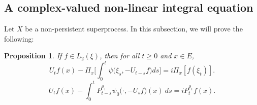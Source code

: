 \documentclass[12pt,a4paper]{amsart}
\theoremstyle{plain}
\newtheorem{prop}[thm]{Proposition}
\theoremstyle{definition}
\numberwithin{equation}{section}
\begin{document}
\subsection{A complex-valued non-linear integral equation}
Let $X$ be a non-persistent superprocess.
In this subsection, we will prove the following:
\begin{prop}
  \label{prop: complex FKPP-equation}
  If $f\in L_2(\xi)$,  then for all $t\geq 0$ and $x\in E$,
\begin{equation}
  \label{eq: complex FKPP-equation}
  U_tf(x) - \Pi_x \Big[\int_0^t \psi\big(\xi_s, - U_{t-s}f\big) ds \Big] 
  = i \Pi_x [f(\xi_t)].
\end{equation}
\begin{equation}
  \label{eq: complex FKPP-equation with FK-transform}
  U_tf(x) -  \int_0^t P_{t-s}^{\rho_1} \psi_0\big(\cdot,-U_sf\big) (x)~ds
  = iP_t^{\rho_1} f(x).
\end{equation}
\end{prop}
\end{document}

